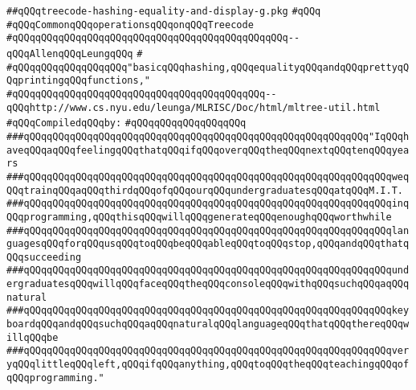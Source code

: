 \label{src/lib/compiler/back/low/treecode/treecode-hashing-equality-and-display-g.pkg}
\verb|##qQQqtreecode-hashing-equality-and-display-g.pkg|\newline
\verb|#qQQq|\newline
\verb|#qQQqCommonqQQqoperationsqQQqonqQQqTreecode|\newline
\verb|#qQQqqQQqqQQqqQQqqQQqqQQqqQQqqQQqqQQqqQQqqQQqqQQq--qQQqAllenqQQqLeungqQQq|\newline
\verb|#|\newline
\verb|#qQQqqQQqqQQqqQQqqQQq"basicqQQqhashing,qQQqequalityqQQqandqQQqprettyqQQqprintingqQQqfunctions,"|\newline
\verb|#qQQqqQQqqQQqqQQqqQQqqQQqqQQqqQQqqQQqqQQqqQQq--qQQqhttp://www.cs.nyu.edu/leunga/MLRISC/Doc/html/mltree-util.html|\newline
\newline
\verb|#qQQqCompiledqQQqby:|\newline
\verb|#qQQqqQQqqQQqqQQqqQQq|\newline
\newline
\newline
\verb|###qQQqqQQqqQQqqQQqqQQqqQQqqQQqqQQqqQQqqQQqqQQqqQQqqQQqqQQqqQQq"IqQQqhaveqQQqaqQQqfeelingqQQqthatqQQqifqQQqoverqQQqtheqQQqnextqQQqtenqQQqyears|\newline
\verb|###qQQqqQQqqQQqqQQqqQQqqQQqqQQqqQQqqQQqqQQqqQQqqQQqqQQqqQQqqQQqqQQqweqQQqtrainqQQqaqQQqthirdqQQqofqQQqourqQQqundergraduatesqQQqatqQQqM.I.T.|\newline
\verb|###qQQqqQQqqQQqqQQqqQQqqQQqqQQqqQQqqQQqqQQqqQQqqQQqqQQqqQQqqQQqqQQqinqQQqprogramming,qQQqthisqQQqwillqQQqgenerateqQQqenoughqQQqworthwhile|\newline
\verb|###qQQqqQQqqQQqqQQqqQQqqQQqqQQqqQQqqQQqqQQqqQQqqQQqqQQqqQQqqQQqqQQqlanguagesqQQqforqQQqusqQQqtoqQQqbeqQQqableqQQqtoqQQqstop,qQQqandqQQqthatqQQqsucceeding|\newline
\verb|###qQQqqQQqqQQqqQQqqQQqqQQqqQQqqQQqqQQqqQQqqQQqqQQqqQQqqQQqqQQqqQQqundergraduatesqQQqwillqQQqfaceqQQqtheqQQqconsoleqQQqwithqQQqsuchqQQqaqQQqnatural|\newline
\verb|###qQQqqQQqqQQqqQQqqQQqqQQqqQQqqQQqqQQqqQQqqQQqqQQqqQQqqQQqqQQqqQQqkeyboardqQQqandqQQqsuchqQQqaqQQqnaturalqQQqlanguageqQQqthatqQQqthereqQQqwillqQQqbe|\newline
\verb|###qQQqqQQqqQQqqQQqqQQqqQQqqQQqqQQqqQQqqQQqqQQqqQQqqQQqqQQqqQQqqQQqveryqQQqlittleqQQqleft,qQQqifqQQqanything,qQQqtoqQQqtheqQQqteachingqQQqofqQQqprogramming."|\newline
